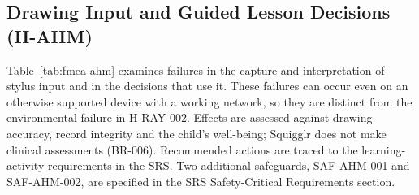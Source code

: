 \documentclass{article}
\begin{document}
\subsection{Drawing Input and Guided Lesson Decisions (H-AHM)}
\label{sec:fmea-ahm}
Table~\ref{tab:fmea-ahm} examines failures in the capture and interpretation of
stylus input and in the decisions that use it. These failures can occur even on
an otherwise supported device with a working network, so they are distinct from
the environmental failure in H-RAY-002. Effects are assessed against drawing
accuracy, record integrity and the child's well-being; Squigglr does not make
clinical assessments (BR-006). Recommended actions are traced to the
learning-activity requirements in the SRS. Two additional safeguards,
SAF-AHM-001 and SAF-AHM-002, are specified in the SRS Safety-Critical
Requirements section.
\end{document}

